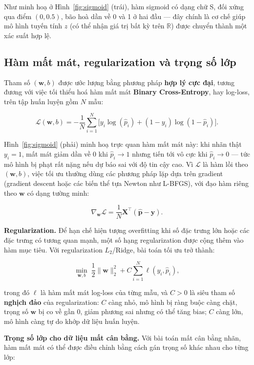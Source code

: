 \documentclass[a4paper]{report}
\begin{document}
Như minh hoạ ở Hình~\ref{fig:sigmoid} (trái), hàm sigmoid có dạng chữ S, đối
xứng qua điểm $(0, 0.5)$, bão hoà dần về 0 và 1 ở hai đầu --- đây chính là cơ
chế giúp mô hình tuyến tính $z$ (có thể nhận giá trị bất kỳ trên
$\mathbb{R}$) được chuyển thành một xác suất hợp lệ.

\subsection{Hàm mất mát, regularization và trọng số lớp}

Tham số $(\mathbf{w}, b)$ được ước lượng bằng phương pháp \textbf{hợp lý cực
đại}, tương đương với việc tối thiểu hoá hàm mất mát
\textbf{Binary Cross-Entropy}, hay log-loss, trên tập huấn luyện gồm $N$ mẫu:

\[
  \mathcal{L}(\mathbf{w}, b) = -\frac{1}{N} \sum_{i=1}^{N}
  \Big[ y_i \log(\hat{p}_i) + (1 - y_i) \log(1 - \hat{p}_i) \Big].
\]

Hình~\ref{fig:sigmoid} (phải) minh hoạ trực quan hàm mất mát này: khi nhãn
thật $y_i = 1$, mất mát giảm dần về 0 khi $\hat{p}_i \to 1$ nhưng tiến tới vô
cực khi $\hat{p}_i \to 0$ --- tức mô hình bị phạt rất nặng nếu dự báo sai với
độ tin cậy cao. Vì $\mathcal{L}$ là hàm lồi theo $(\mathbf{w}, b)$, việc tối ưu
thường dùng các phương pháp lặp dựa trên gradient (gradient descent hoặc các
biến thể tựa Newton như L-BFGS), với đạo hàm riêng theo $\mathbf{w}$ có dạng
tường minh:

\[
  \nabla_{\mathbf{w}} \mathcal{L} = \frac{1}{N} \mathbf{X}^\top
  (\hat{\mathbf{p}} - \mathbf{y}).
\]

\label{sec:logreg_reg}
\noindent\textbf{Regularization.} Để hạn chế hiện tượng overfitting khi số đặc trưng lớn hoặc các đặc
trưng có tương quan mạnh, một số hạng regularization được cộng thêm vào hàm
mục tiêu. Với regularization $L_2$/Ridge, bài toán tối ưu trở thành:

\[
  \min_{\mathbf{w}, b} \; \frac{1}{2} \lVert \mathbf{w} \rVert_2^2
  + C \sum_{i=1}^{N} \ell(y_i, \hat{p}_i),
\]

trong đó $\ell$ là hàm mất mát log-loss của từng mẫu, và $C > 0$ là siêu tham
số \textbf{nghịch đảo} của regularization: $C$ càng nhỏ, mô hình bị ràng
buộc càng chặt, trọng số $\mathbf{w}$ bị co về gần 0, giảm phương sai nhưng có
thể tăng bias; $C$ càng lớn, mô hình càng tự do khớp dữ liệu huấn
luyện. 

\label{sec:logreg_weight}
\noindent\textbf{Trọng số lớp cho dữ liệu mất cân bằng.} Với bài toán mất cân bằng nhãn, hàm mất mát có thể được điều chỉnh bằng cách
gán trọng số khác nhau cho từng lớp:
\end{document}
